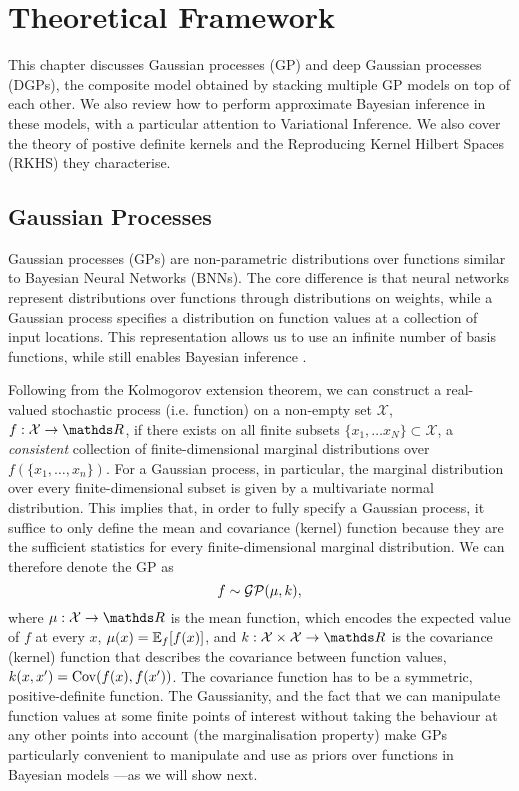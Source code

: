 
\chapter{Theoretical Framework}
\label{chapter:theoretical-framework}

This chapter discusses Gaussian processes (GP) and deep Gaussian processes (DGPs), the composite model obtained by stacking multiple GP models on top of each other. We also review how to perform approximate Bayesian inference in these models, with a particular attention to Variational Inference. We also cover the theory of postive definite kernels and the Reproducing Kernel Hilbert Spaces (RKHS) they characterise.

\section{Gaussian Processes}
\label{sec:chapter1:gp}


Gaussian processes (GPs) \citep{rasmussen2006} are non-parametric distributions over functions similar to Bayesian Neural Networks (BNNs). The core difference is that neural networks represent distributions over functions through distributions on weights, while a Gaussian process specifies a distribution on function values at a collection of input locations. This representation allows us to use an infinite number of basis functions, while still enables Bayesian inference \citep{neal1996bayesian}. 

Following from the Kolmogorov extension theorem, we can construct a real-valued stochastic process (i.e. function) on a non-empty set $\mathcal{X}$, $f: \mathcal{X} \rightarrow \Reals$, if there exists on all finite subsets $\{x_1, \ldots x_N\} \subset \mathcal{X}$, a \emph{consistent} collection of finite-dimensional marginal distributions over $f(\{x_1, \ldots, x_n\})$. For a Gaussian process, in particular, the marginal distribution over every finite-dimensional subset is given by a multivariate normal distribution. This implies that, in order to fully specify a Gaussian process, it suffice to only define the mean and covariance (kernel) function because they are the sufficient statistics for every finite-dimensional marginal distribution. We can therefore denote the GP as
\begin{equation}
  \label{eq:chapter1:def-gp}
  f \sim \mathcal{GP}(\mu, k),
\end{equation}
where $\mu:\mathcal{X}\rightarrow\Reals$ is the mean function, which encodes the expected value of $f$ at every $x$, $\mu(x) = \Exp{f}{f(x)}$, and $k:\mathcal{X} \times \mathcal{X} \rightarrow \Reals$ is the covariance (kernel) function that describes the covariance between function values, $k(x, x') = \Cov\left(f(x), f(x')\right)$. The covariance function has to be a symmetric, positive-definite function. The Gaussianity, and the fact that we can manipulate function values at some finite points of interest without taking the behaviour at any other points into account (the marginalisation property) make GPs particularly convenient to manipulate and use as priors over functions in Bayesian models ---as we will show next.

